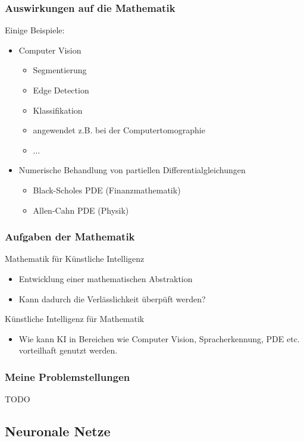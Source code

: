 \documentclass[10pt]{beamer} %
\begin{document}
\begin{frame}
   \frametitle[]{Auswirkungen auf die Mathematik}
   Einige Beispiele:
   \begin{itemize}
      \item Computer Vision
      \begin{itemize}
         \item Segmentierung
         \item Edge Detection
         \item Klassifikation
         \item angewendet z.B. bei der Computertomographie
         \item $\ldots$
      \end{itemize}
      \pause
      \item Numerische Behandlung von partiellen Differentialgleichungen
      \begin{itemize}
         \item Black-Scholes PDE (Finanzmathematik)
         \item Allen-Cahn PDE (Physik)
      \end{itemize}
   \end{itemize}
\end{frame}

\begin{frame}
   \frametitle[]{Aufgaben der Mathematik}
   Mathematik für Künstliche Intelligenz
   \begin{itemize}
      \pause
      \item Entwicklung einer mathematischen Abstraktion
      \item Kann dadurch die Verlässlichkeit überpüft werden?
   \end{itemize}
   \pause
   Künstliche Intelligenz für Mathematik
   \begin{itemize}
      \item Wie kann KI in Bereichen wie Computer Vision, Spracherkennung, PDE etc. vorteilhaft genutzt werden.
   \end{itemize}
\end{frame}

\begin{frame}
   \frametitle[]{Meine Problemstellungen}
   TODO
\end{frame}
\subsection{Neuronale Netze}
\end{document}
